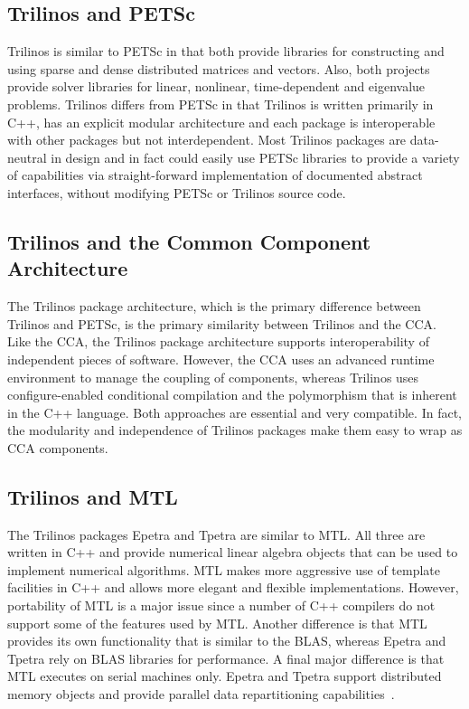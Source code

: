 \documentclass[12pt,relax]{TPA}
\begin{document}
\subsection{Trilinos and PETSc}
Trilinos is similar to PETSc in that both provide libraries for
constructing and using sparse and dense distributed matrices and
vectors.  Also, both projects provide solver libraries for linear, nonlinear,
time-dependent and eigenvalue problems.  Trilinos differs from PETSc
in that Trilinos is written primarily in C++, has an explicit
modular architecture and each package is interoperable with other
packages but not interdependent.  Most Trilinos packages are
data-neutral in design and in fact could easily use PETSc libraries to
provide a variety of capabilities via straight-forward implementation
of documented abstract interfaces, without modifying PETSc or Trilinos source code.  

\subsection{Trilinos and the Common Component Architecture}
The Trilinos package architecture, which is the primary difference between
Trilinos and PETSc,
is the primary similarity between Trilinos and the CCA.  Like the CCA,
the Trilinos
package architecture supports interoperability of independent
pieces of software.  However, the CCA uses an advanced runtime
environment to manage the coupling of components, whereas Trilinos
uses configure-enabled conditional compilation and the polymorphism
that is inherent in the C++ language.  Both
approaches are essential and very compatible.  In fact, the modularity
and independence of Trilinos
packages make them easy to wrap as CCA components.

\subsection{Trilinos and MTL}
The Trilinos packages Epetra and Tpetra are similar to MTL.  All three
are written in C++ and provide numerical linear algebra objects
that can be used to implement numerical algorithms.  MTL
makes more aggressive use of template facilities in C++ and allows
more elegant and flexible implementations.  However, portability of
MTL is a major issue since a number of C++ compilers do not 
support some of
the features used by MTL.  Another difference is that MTL provides its
own functionality that is similar to the BLAS, whereas Epetra and
Tpetra rely on BLAS libraries for performance.  A final
major difference is that MTL executes on serial machines only.  
Epetra and Tpetra support distributed
memory objects and provide parallel data repartitioning
capabilities~\cite{Repartitioning}.
\end{document}
